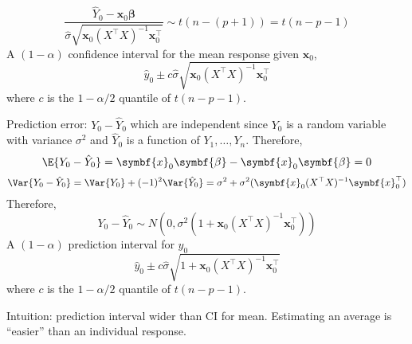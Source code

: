 \[ \frac{\hat{Y}_0-\symbf{x}_0\symbf{\beta}}{\hat{\sigma}\sqrt{
            \symbf{x}_0(X^\top X)^{-1}\symbf{x}_0^\top
        }}\sim t(n-(p+1))=t(n-p-1)  \]
A $ (1-\alpha) $ confidence interval for the mean
response given $ \symbf{x}_0 $,
\[ \hat{y}_0\pm c \hat{\sigma}\sqrt{
        \symbf{x}_0(X^\top X)^{-1}\symbf{x}_0^\top} \]
where $ c $ is the $ 1-\alpha/2 $ quantile of $ t(n-p-1) $.

Prediction error: $ Y_0-\hat{Y}_0 $ which are independent
since $ Y_0 $ is a random variable with variance $ \sigma^2 $
and $ \hat{Y}_0 $ is a function of $ Y_1,\ldots,Y_n $. Therefore,
\[ \E{Y_0-\hat{Y}_0}=\symbf{x}_0\symbf{\beta}-\symbf{x}_0\symbf{\beta}=0 \]
\[ \Var{Y_0-\hat{Y}_0}=\Var{Y_0}+(-1)^2\Var{\hat{Y}_0}=
    \sigma^2+\sigma^2(\symbf{x}_0(X^\top X)^{-1}\symbf{x}_0^\top) \]
Therefore,
\[ Y_0-\hat{Y}_0 \sim N(
    0,\sigma^2(1+\symbf{x}_0(X^\top X)^{-1}\symbf{x}_0^\top)
    ) \]
A $ (1-\alpha) $ prediction interval for $ y_0 $
\[ \hat{y}_0\pm c\hat{\sigma}\sqrt{1+\symbf{x}_0(X^\top X)^{-1}\symbf{x}_0^\top} \]
where $ c $ is the $ 1-\alpha/2 $ quantile of $ t(n-p-1) $.

Intuition: prediction interval wider than CI for mean. Estimating
an average is ``easier'' than an individual response.
